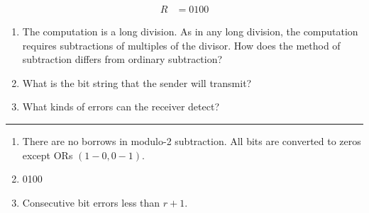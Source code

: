 \documentclass[twoside]{article}
\newenvironment{answer}
  {\vspace*{0.2cm} \rule{12cm}{0.04cm} \vspace*{0.2cm}}
  {\vspace*{0.2cm}}
\begin{document}
\begin{enumerate}
  \begin{align*}
    R & = 0100
    \end{align*}

  \begin{enumerate}
    \item The computation is a long division. As in any long division, the computation
      requires subtractions of multiples of the divisor. How does the method of subtraction
      differs from ordinary subtraction? 
    \item What is the bit string that the sender will transmit?
    \item What kinds of errors can the receiver detect?
    \end{enumerate}

  \begin{answer}

  \begin{enumerate}
    \item There are no borrows in modulo-2 subtraction. All bits are converted to zeros except ORs $(1-0, 0-1)$.
    \item 0100
    \item Consecutive bit errors less than $r+1$.
    \end{enumerate}

    \end{answer}

  \end{enumerate}
\end{document}
